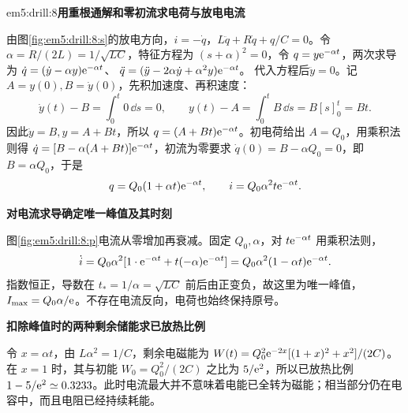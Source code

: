 \begin{drillsolution}{em5:drill:8}\textbf{用重根通解和零初流求电荷与放电电流}\par\nobreak
由图\ref{fig:em5:drill:8:s}的放电方向，$i=-\dot q$，$L\ddot q+R\dot q+q/C=0$。令 $\alpha=R/(2L)=1/\sqrt{LC}$，特征方程为 $(s+\alpha)^2=0$，令 $q=y\mathrm e^{-\alpha t}$，两次求导为
$\dot q=(\dot y-\alpha y)\mathrm e^{-\alpha t}$、
$\ddot q=(\ddot y-2\alpha\dot y+\alpha^2y)\mathrm e^{-\alpha t}$。
代入方程后$\ddot y=0$。记$A=y(0),B=\dot y(0)$，先积加速度、再积速度：
\[
\dot y(t)-B=\int_0^t0\,\dd s=0,\qquad
y(t)-A=\int_0^tB\,\dd s=B[s]_0^t=Bt.
\]
因此$\dot y=B,y=A+Bt$，所以 $q=(A+Bt)\mathrm e^{-\alpha t}$。初电荷给出 $A=Q_0$，用乘积法则得 $\dot q=[B-\alpha(A+Bt)]\mathrm e^{-\alpha t}$，初流为零要求 $\dot q(0)=B-\alpha Q_0=0$，即 $B=\alpha Q_0$，于是
\[q=Q_0(1+\alpha t)\mathrm e^{-\alpha t},\qquad i=Q_0\alpha^2t\mathrm e^{-\alpha t}.\]



\par\medskip{}\noindent\textbf{对电流求导确定唯一峰值及其时刻}\par\nobreak
图\ref{fig:em5:drill:8:p}电流从零增加再衰减。固定 $Q_0,\alpha$，对 $t\mathrm e^{-\alpha t}$ 用乘积法则，
\[
 \dot i=Q_0\alpha^2[1\cdot\mathrm e^{-\alpha t}
                   +t(-\alpha)\mathrm e^{-\alpha t}]
 =Q_0\alpha^2(1-\alpha t)\mathrm e^{-\alpha t}.
\]
指数恒正，导数在 $t_*=1/\alpha=\sqrt{LC}$ 前后由正变负，故这里为唯一峰值，$I_{\max}=Q_0\alpha/\mathrm e$。不存在电流反向，电荷也始终保持原号。



\par\medskip{}\noindent\textbf{扣除峰值时的两种剩余储能求已放热比例}\par\nobreak
令 $x=\alpha t$，由 $L\alpha^2=1/C$，剩余电磁能为 $W(t)=Q_0^2\mathrm e^{-2x}[(1+x)^2+x^2]/(2C)$。在 $x=1$ 时，其与初能 $W_0=Q_0^2/(2C)$ 之比为 $5/\mathrm e^2$，所以已放热比例 $1-5/\mathrm e^2\simeq0.3233$。此时电流最大并不意味着电能已全转为磁能；相当部分仍在电容中，而且电阻已经持续耗能。\end{drillsolution}
